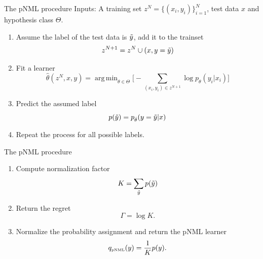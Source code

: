 \documentclass[aspectratio=169]{beamer}
\DeclareMathOperator*{\argmin}{arg\,min}
\begin{document}
\begin{frame}{The pNML procedure}
Inputs: A training set $z^N=\{(x_i,y_i)\}_{i=1}^N$, test data $x$ and hypothesis class $\Theta$. 
\begin{enumerate}
    \item Assume the label of the test data is $\Tilde{y}$, add it to the trainset 
    \begin{equation*}
        z^{N+1} = z^N \cup (x,y=\Tilde{y})
    \end{equation*}
    \item Fit a learner
    \begin{equation*}
        \hat{\theta}(z^N,x,y) = \argmin_{\theta \in \Theta} \bigg[-\sum_{(x_i,y_i)\in z^{N+1}} \log p_{\theta}(y_i|x_i) \bigg]
    \end{equation*}
    \item Predict the assumed label 
    \begin{equation*}
    p(\Tilde{y}) = p_{\hat{\theta}}(y=\Tilde{y}|x)            
    \end{equation*}
    \pause
    \item Repeat the process for all possible labels.
\end{enumerate}
\end{frame}



\begin{frame}{The pNML procedure}
\begin{enumerate}
\setlength\itemsep{2em}
\setcounter{enumi}{4}
\item Compute normalization factor
    \begin{equation*}
        K = \sum_{\Tilde{y}}p(\Tilde{y})
    \end{equation*}
\item Return the regret
\begin{equation*}
    \Gamma = \log K.  
\end{equation*}
\item Normalize the probability assignment and return the pNML learner
    \begin{equation*}
        q_{\mbox{\tiny{pNML}}}(y) = \frac{1}{K}p(y).
    \end{equation*}
\end{enumerate}
\end{frame}
\end{document}
